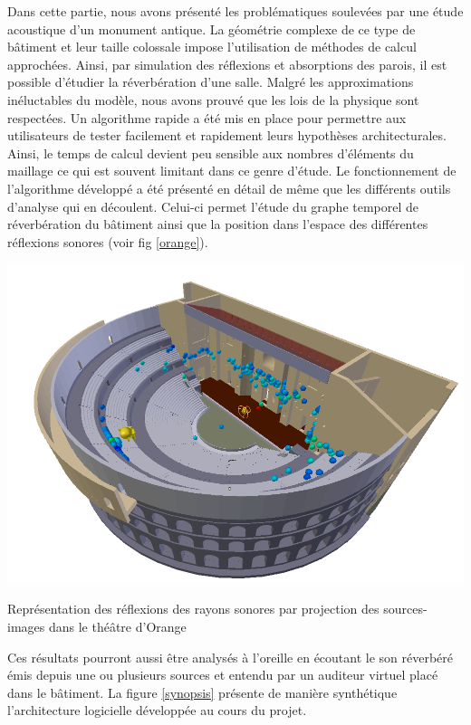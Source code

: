 Dans cette partie, nous avons présenté les problématiques soulevées par une étude acoustique d'un monument antique. La géométrie complexe de ce type de bâtiment et leur taille colossale impose l'utilisation de méthodes de calcul approchées. Ainsi, par simulation des réflexions et absorptions des parois, il est possible d'étudier la réverbération d'une salle. Malgré les approximations inéluctables du modèle, nous avons prouvé que les lois de la physique sont respectées. Un algorithme rapide a été mis en place pour permettre aux utilisateurs de tester facilement et rapidement leurs hypothèses architecturales. Ainsi, le temps de calcul devient peu sensible aux nombres d'éléments du maillage ce qui est souvent limitant dans ce genre d'étude. Le fonctionnement de l'algorithme développé a été présenté en détail de même que les différents outils d'analyse qui en découlent. Celui-ci permet l'étude du graphe temporel de réverbération du bâtiment ainsi que la position dans l'espace des différentes réflexions sonores (voir fig \ref{orange}). 
%
\begin{figureth}
	\includegraphics[width=0.9\linewidth]{images/orange}
	\caption{Représentation des réflexions des rayons sonores par projection des sources-images dans le théâtre d'Orange}
	\label{orange}
\end{figureth}
%
Ces résultats pourront aussi être analysés à l'oreille en écoutant le son réverbéré émis depuis une ou plusieurs sources et entendu par un auditeur virtuel placé dans le bâtiment. La figure \ref{synopsis} présente de manière synthétique l'architecture logicielle développée au cours du projet. 

